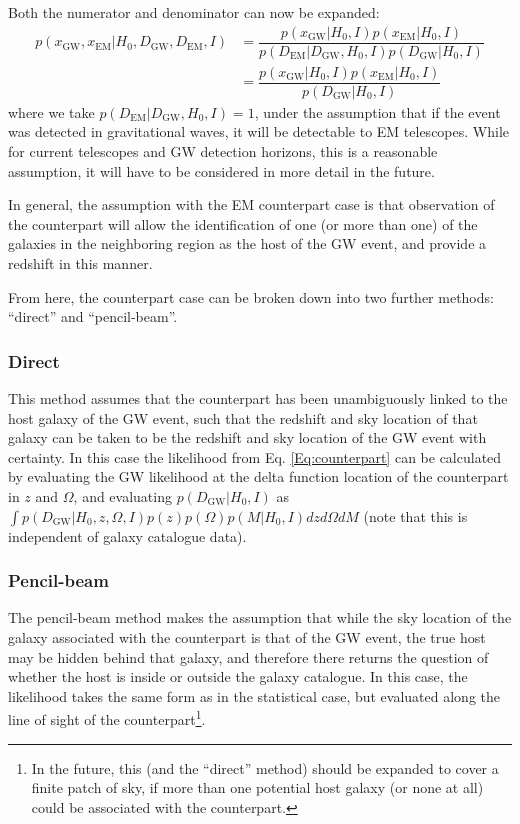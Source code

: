 \documentclass[a4paper,10pt]{article}
\begin{document}
Both the numerator and denominator can now be expanded:
\begin{equation} \label{Eq:counterpart}
\begin{aligned}
p(x_{\text{GW}},x_{\text{EM}}|H_0,D_{\text{GW}},D_{\text{EM}},I) &= \dfrac{p(x_{\text{GW}}|H_0,I) p(x_{\text{EM}}|H_0,I)}{p(D_{\text{EM}}|D_{\text{GW}},H_0,I) p(D_{\text{GW}}|H_0,I)} 
\\ &= \dfrac{p(x_{\text{GW}}|H_0,I) p(x_{\text{EM}}|H_0,I)}{p(D_{\text{GW}}|H_0,I)} 
\end{aligned} 
\end{equation}
where we take $p(D_{\text{EM}}|D_{\text{GW}},H_0,I) = 1$, under the assumption that if the event was detected in gravitational waves, it will be detectable to EM telescopes.  While for current telescopes and GW detection horizons, this is a reasonable assumption, it will have to be considered in more detail in the future.

In general, the assumption with the EM counterpart case is that observation of the counterpart will allow the identification of one (or more than one) of the galaxies in the neighboring region as the host of the GW event, and provide a redshift in this manner.

From here, the counterpart case can be broken down into two further methods: ``direct'' and ``pencil-beam''. 

\subsubsection{Direct}
This method assumes that the counterpart has been unambiguously linked to the host galaxy of the GW event, such that the redshift and sky location of that galaxy can be taken to be the redshift and sky location of the GW event with certainty.  In this case the likelihood from Eq. \ref{Eq:counterpart} can be calculated by evaluating the GW likelihood at the delta function location of the counterpart in $z$ and $\Omega$, and evaluating $p(D_{\text{GW}}|H_0,I)$ as $\int p(D_{\text{GW}}|H_0,z,\Omega,I) p(z)p(\Omega)p(M|H_0,I) dz d\Omega dM$ (note that this is independent of galaxy catalogue data).



\subsubsection{Pencil-beam}
The pencil-beam method makes the assumption that while the sky location of the galaxy associated with the counterpart is that of the GW event, the true host may be hidden behind that galaxy, and therefore there returns the question of whether the host is inside or outside the galaxy catalogue.  In this case, the likelihood takes the same form as in the statistical case, but evaluated along the line of sight of the counterpart\footnote{In the future, this (and the ``direct'' method) should be expanded to cover a finite patch of sky, if more than one potential host galaxy (or none at all) could be associated with the counterpart.}.
\end{document}
